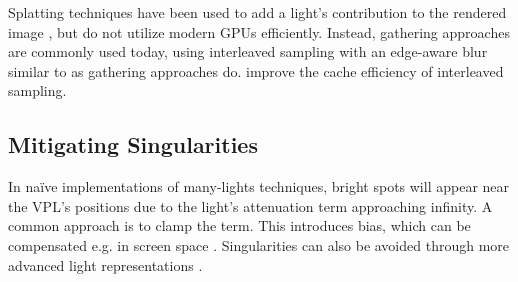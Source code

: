 Splatting techniques have been used to add a light's contribution to the rendered image \citep{dachsbacher2006splatting, Nichols:2009:splatting}, but do not utilize modern GPUs efficiently. Instead, gathering approaches are commonly used today, using interleaved sampling \citep{Keller:2001:InterleavedSampling} with an edge-aware blur similar to \citep{laine2007incremental} as gathering approaches do. \cite{segovia2006non} improve the cache efficiency of interleaved sampling.



\subsection{Mitigating Singularities}
 In naïve implementations of many-lights techniques, bright spots will appear near the VPL’s positions due to the light’s attenuation term approaching infinity. A common approach is to clamp the term. This introduces bias, which can be compensated e.g. in screen space \citep{novak2011screen}. Singularities can also be avoided through more advanced light representations \citep{tokuyoshi2015vsgl}.
 

\cleardoublepage
